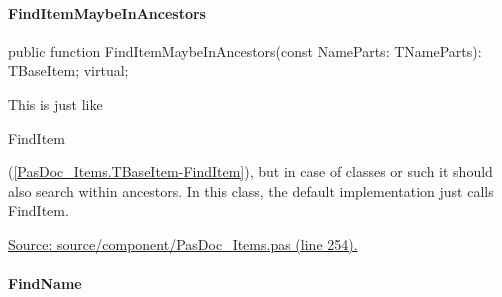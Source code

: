\documentclass{report}
\newif\ifpdf
\begin{document}
\paragraph*{FindItemMaybeInAncestors}\hspace*{\fill}

\label{PasDoc_Items.TBaseItem-FindItemMaybeInAncestors}
\begin{list}{}{
\setlength{\itemindent}{0cm}
\setlength{\listparindent}{0cm}
\setlength{\leftmargin}{\evensidemargin}
\addtolength{\leftmargin}{\tmplength}
\settowidth{\labelsep}{X}
\addtolength{\leftmargin}{\labelsep}
\setlength{\labelwidth}{\tmplength}
}
\item[\textbf{Declaration}\hfill]
\ifpdf
\begin{flushleft}
\fi
\begin{ttfamily}
public function FindItemMaybeInAncestors(const NameParts: TNameParts): TBaseItem; virtual;\end{ttfamily}

\ifpdf
\end{flushleft}
\fi

\par
\item[\textbf{Description}]
This is just like \begin{ttfamily}FindItem\end{ttfamily}(\ref{PasDoc_Items.TBaseItem-FindItem}), but in case of classes or such it should also search within ancestors. In this class, the default implementation just calls FindItem.\par
\href{https://github.com/pasdoc/pasdoc/blob/master/source/component/PasDoc_Items.pas#L254}{Source: source/component/PasDoc{\_}Items.pas (line 254).}

\end{list}
\paragraph*{FindName}\hspace*{\fill}
\end{document}
